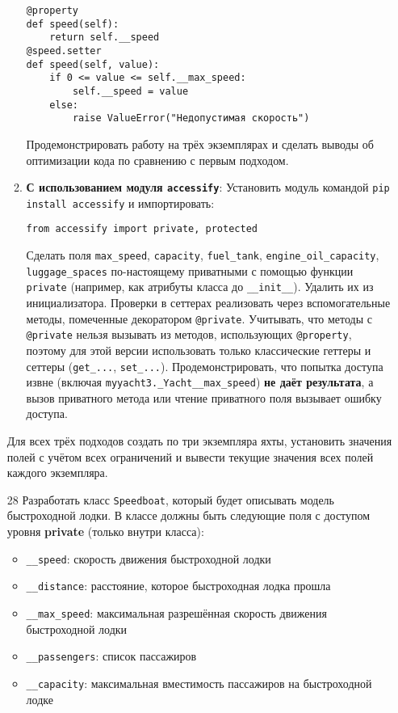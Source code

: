 \begin{enumerate}
\begin{enumerate}
\begin{verbatim}
@property
def speed(self):
    return self.__speed
@speed.setter
def speed(self, value):
    if 0 <= value <= self.__max_speed:
        self.__speed = value
    else:
        raise ValueError("Недопустимая скорость")
    \end{verbatim}  
    Продемонстрировать работу на трёх экземплярах и сделать выводы об оптимизации кода по сравнению с первым подходом.
    \item \textbf{С использованием модуля \texttt{accessify}}:  
    Установить модуль командой \texttt{pip install accessify} и импортировать:  
    \begin{verbatim}
from accessify import private, protected
    \end{verbatim}  
    Сделать поля \texttt{max\_speed}, \texttt{capacity}, \texttt{fuel\_tank}, \texttt{engine\_oil\_capacity}, \texttt{luggage\_spaces} по-настоящему приватными с помощью функции \texttt{private} (например, как атрибуты класса до \texttt{\_\_init\_\_}). Удалить их из инициализатора.  
    Проверки в сеттерах реализовать через вспомогательные методы, помеченные декоратором \texttt{@private}.  
    Учитывать, что методы с \texttt{@private} нельзя вызывать из методов, использующих \texttt{@property}, поэтому для этой версии использовать только классические геттеры и сеттеры (\texttt{get\_...}, \texttt{set\_...}).  
    Продемонстрировать, что попытка доступа извне (включая \texttt{myyacht3.\_Yacht\_\_max\_speed}) \textbf{не даёт результата}, а вызов приватного метода или чтение приватного поля вызывает ошибку доступа.
\end{enumerate}
Для всех трёх подходов создать по три экземпляра яхты, установить значения полей с учётом всех ограничений и вывести текущие значения всех полей каждого экземпляра.
\item[28] Разработать класс \texttt{Speedboat}, который будет описывать модель быстроходной лодки. В классе должны быть следующие поля с доступом уровня \textbf{private} (только внутри класса):
\begin{itemize}
    \item \texttt{\_\_speed}: скорость движения быстроходной лодки  
    \item \texttt{\_\_distance}: расстояние, которое быстроходная лодка прошла  
    \item \texttt{\_\_max\_speed}: максимальная разрешённая скорость движения быстроходной лодки  
    \item \texttt{\_\_passengers}: список пассажиров  
    \item \texttt{\_\_capacity}: максимальная вместимость пассажиров на быстроходной лодке  

\end{itemize}
\end{enumerate}
